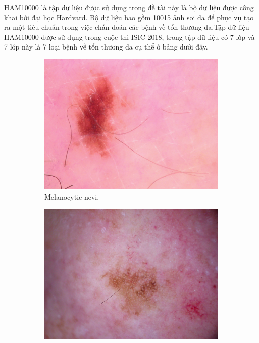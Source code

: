\documentclass[12pt,a4paper]{article}
\begin{document}
	HAM10000 là tập dữ liệu được sử dụng trong đề tài này là bộ dữ liệu được công khai bởi đại học Hardvard. Bộ dữ liệu bao gồm 10015 ảnh soi da để phục vụ tạo ra một tiêu chuẩn trong việc chẩn đoán các bệnh về tổn thương da.Tập dữ liệu HAM10000 được sử dụng trong cuộc thi ISIC 2018, trong tập dữ liệu có 7 lớp và 7 lớp này là 7 loại bệnh về tổn thương da cụ thể ở bảng dưới đây.\\
	
	
	\begin{figure}[h!]
		\centering
		\begin{subfigure}[b]{0.3\linewidth}
			\includegraphics[width=\linewidth]{./images/nv.jpg}
			\caption{Melanocytic nevi.}
		\end{subfigure}
		\begin{subfigure}[b]{0.3\linewidth}
			\includegraphics[width=\linewidth]{./images/akiec.jpg}

\end{subfigure}
\end{figure}
\end{document}
